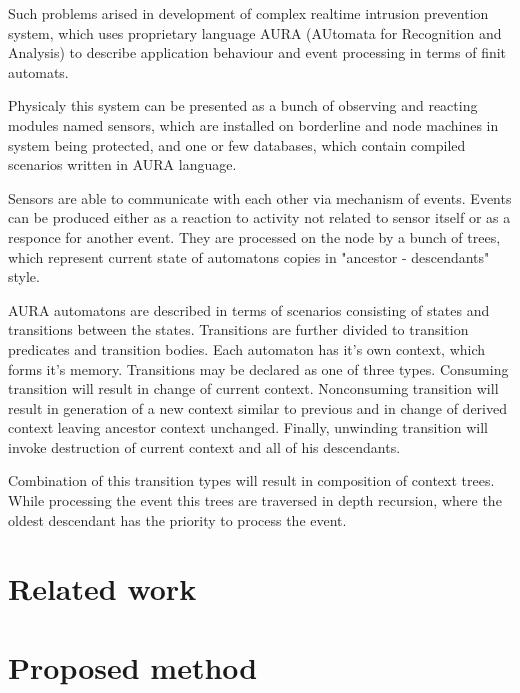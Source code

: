 \documentclass[10pt, conference, compsocconf]{IEEEtran}
\begin{document}
Such problems arised in development of complex realtime intrusion prevention system, which uses proprietary language AURA (AUtomata for Recognition and Analysis) to describe application behaviour and event processing in terms of finit automats.

Physicaly this system can be presented as a bunch of observing and reacting modules named sensors, which are installed on borderline and node machines in system being protected, and one or few databases, which contain compiled scenarios written in AURA language.

Sensors are able to communicate with each other via mechanism of events. Events can be produced either as a reaction to activity not related to sensor itself or as a responce for another event. They are processed on the node by a bunch of trees, which represent current state of automatons copies in "ancestor - descendants" style.

AURA automatons are described in terms of scenarios consisting of states and transitions between the states. Transitions are further divided to transition predicates and transition bodies. Each automaton has it's own context, which forms it's memory. Transitions may be declared as one of three types. Consuming transition will result in change of current context. Nonconsuming transition will result in generation of a new context similar to previous and in change of derived context leaving ancestor context unchanged. Finally, unwinding transition will invoke destruction of current context and all of his descendants.

Combination of this transition types will result in composition of context trees. While processing the event this trees are traversed in depth recursion, where the oldest descendant has the priority to process the event. 
 
\section{Related work}


 
\section{Proposed method}
\end{document}
